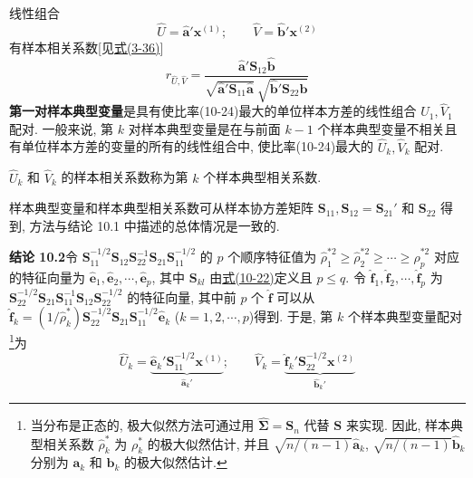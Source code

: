 线性组合
\label{eq:10-23}
\begin{equation}
\hat{U}=\hat{\mathbf{a}}'\mathbf{x}^{(1)};\qquad \hat{V}=\hat{\mathbf{b}}'\mathbf{x}^{(2)}
\tag{10-23}
\end{equation}
有样本相关系数[见\hyperref[eq:3-36]{式(3-36)}]
\label{eq:10-24}
\begin{equation}
r_{\hat{U},\hat{V}}=\frac{\hat{\mathbf{a}}'\mathbf{S}_{12}\hat{\mathbf{b}}}{\sqrt{\hat{\mathbf{a}}'\mathbf{S}_{11}\hat{\mathbf{a}}}\ \sqrt{\hat{\mathbf{b}}'\mathbf{S}_{22}\hat{\mathbf{b}}}}
\tag{10-24}
\end{equation}
\textbf{第一对样本典型变量}是具有使比率(10-24)最大的单位样本方差的线性组合 $\hat{U}_1,\hat{V}_1$ 配对. 一般来说, 第 $k$ 对样本典型变量是在与前面 $k-1$ 个样本典型变量不相关且有单位样本方差的变量的所有的线性组合中, 使比率(10-24)最大的 $\hat{U}_k,\hat{V}_k$ 配对.

$\hat{U}_k$ 和 $\hat{V}_k$ 的样本相关系数称为第 $k$ 个样本典型相关系数.

样本典型变量和样本典型相关系数可从样本协方差矩阵 $\mathbf{S}_{11},\mathbf{S}_{12}=\mathbf{S}_{21}'$ 和 $\mathbf{S}_{22}$ 得到, 方法与结论 10.1 中描述的总体情况是一致的.

\noindent\textbf{结论 10.2}\quad 令 $\mathbf{S}_{11}^{-1/2}\mathbf{S}_{12}\mathbf{S}_{22}^{-1}\mathbf{S}_{21}\mathbf{S}_{11}^{-1/2}$ 的 $p$ 个顺序特征值为 $\hat{\rho}_1^{*2}\ge\hat{\rho}_2^{*2}\ge\cdots\ge\hat{\rho}_p^{*2}$ 对应的特征向量为 $\hat{\mathbf{e}}_1,\hat{\mathbf{e}}_2,\cdots,\hat{\mathbf{e}}_p$, 其中 $\mathbf{S}_{kl}$ 由\hyperref[eq:10-22]{式(10-22)}定义且 $p\le q$. 令 $\hat{\mathbf{f}}_1,\hat{\mathbf{f}}_2,\cdots,\hat{\mathbf{f}}_p$ 为 $\mathbf{S}_{22}^{-1/2}\mathbf{S}_{21}\mathbf{S}_{11}^{-1}\mathbf{S}_{12}\mathbf{S}_{22}^{-1/2}$ 的特征向量, 其中前 $p$ 个 $\hat{\mathbf{f}}$ 可以从 $\hat{\mathbf{f}}_k=(1/\hat{\rho}_k^*)\mathbf{S}_{22}^{-1/2}\mathbf{S}_{21}\mathbf{S}_{11}^{-1/2}\hat{\mathbf{e}}_k$ ($k=1,2,\cdots,p$)得到. 于是, 第 $k$ 个样本典型变量配对\footnote{{\footnotesize 当分布是正态的, 极大似然方法可通过用 $\hat{\boldsymbol{\Sigma}}=\mathbf{S}_n$ 代替 $\mathbf{S}$ 来实现. 因此, 样本典型相关系数 $\hat{\rho}_k^*$ 为 $\rho_k^*$ 的极大似然估计, 并且 $\sqrt{n/(n-1)}\hat{\mathbf{a}}_k$, $\sqrt{n/(n-1)}\hat{\mathbf{b}}_k$ 分别为 $\mathbf{a}_k$ 和 $\mathbf{b}_k$ 的极大似然估计.}}为
\[
\hat{U}_k=\underbrace{\hat{\mathbf{e}}_k'\mathbf{S}_{11}^{-1/2}\mathbf{x}^{(1)}}_{\hat{\mathbf{a}}_k'};\qquad \hat{V}_k=\underbrace{\hat{\mathbf{f}}_k'\mathbf{S}_{22}^{-1/2}\mathbf{x}^{(2)}}_{\hat{\mathbf{b}}_k'}
\]
